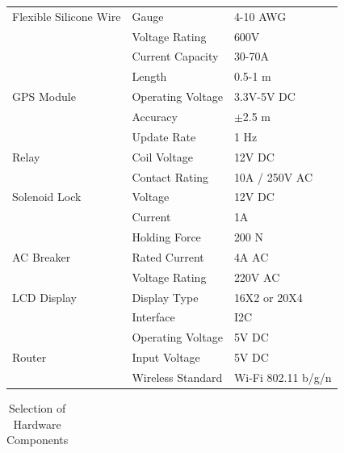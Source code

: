 {\begin{longtable}{p{4cm} p{4.8cm} p{4cm}}
	\addlinespace[0.6em]
	
	Flexible Silicone Wire & Gauge & 4-10 AWG \\
	& Voltage Rating & 600V \\
	& Current Capacity & 30-70A \\
	& Length & 0.5-1 m \\
	
	\addlinespace[0.6em]
	
	GPS Module & Operating Voltage & 3.3V-5V DC \\
	& Accuracy & $\pm$2.5 m \\
	& Update Rate & 1 Hz \\
	
	\addlinespace[0.6em]
	
	Relay & Coil Voltage & 12V DC \\
	& Contact Rating & 10A / 250V AC \\
	
	\addlinespace[0.6em]
	
	Solenoid Lock & Voltage & 12V DC \\
	& Current & 1A \\
	& Holding Force & 200 N \\
	
	\addlinespace[0.6em]
	
	AC Breaker & Rated Current & 4A AC \\
	& Voltage Rating & 220V AC \\
	
	\addlinespace[0.6em]
	
	LCD Display & Display Type & 16X2 or 20X4  \\
	& Interface & I2C \\
	& Operating Voltage & 5V DC \\
	
	\addlinespace[0.6em]
	
	Router & Input Voltage & 5V DC \\
	& Wireless Standard & Wi-Fi 802.11 b/g/n \\
	
\end{longtable}


\begin{longtable}{|p{6cm} | p{7cm}|}
	\caption{Selection of Hardware Components} \label{tab:components} \\
	


\end{longtable}}
